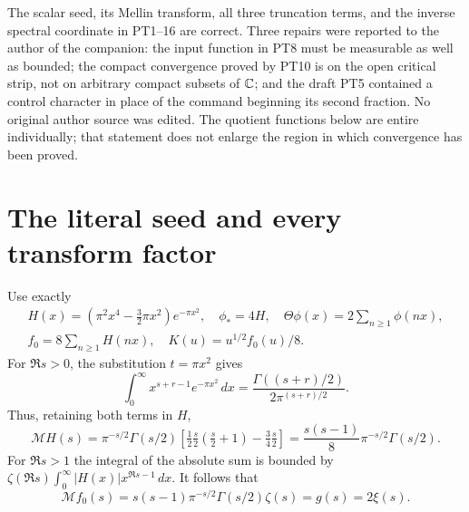 \documentclass[11pt]{article}
\begin{document}
The scalar seed, its Mellin transform, all three truncation terms,
and the inverse spectral coordinate in PT1--16 are correct.
Three repairs were reported to the author of the companion:
the input function in PT8 must be measurable as well as bounded;
the compact convergence proved by PT10 is on the open critical strip,
not on arbitrary compact subsets of $\mathbb C$;
and the draft PT5 contained a control character in place of
the command beginning its second fraction. No original author
source was edited. The quotient functions below are entire individually;
that statement does not enlarge the region in which convergence has
been proved.

\section{The literal seed and every transform factor}
Use exactly
\[
 \begin{gathered}
 H(x)=(\pi^2x^4-\tfrac32\pi x^2)e^{-\pi x^2},\quad
 \phi_*=4H,\quad \Theta\phi(x)=2\sum_{n\ge1}\phi(nx),\\
 f_0=8\sum_{n\ge1}H(nx),\quad K(u)=u^{1/2}f_0(u)/8.
 \end{gathered}
\]
For $\Re s>0$, the substitution $t=\pi x^2$ gives
\[
 \int_0^\infty x^{s+r-1}e^{-\pi x^2}\,dx
 =\frac{\Gamma((s+r)/2)}{2\pi^{(s+r)/2}}.
\]
Thus, retaining both terms in $H$,
\begin{equation}\tag{IC1}
 \mathcal MH(s)=\pi^{-s/2}\Gamma(s/2)
 \left[\tfrac12\tfrac s2(\tfrac s2+1)-\tfrac34\tfrac s2\right]
 =\frac{s(s-1)}8\pi^{-s/2}\Gamma(s/2).
\end{equation}
For $\Re s>1$ the integral of the absolute sum is bounded by
$\zeta(\Re s)\int_0^\infty|H(x)|x^{\Re s-1}\,dx$.
It follows that
\[
 \mathcal Mf_0(s)=s(s-1)\pi^{-s/2}\Gamma(s/2)\zeta(s)=g(s)=2\xi(s).
\]
\end{document}
